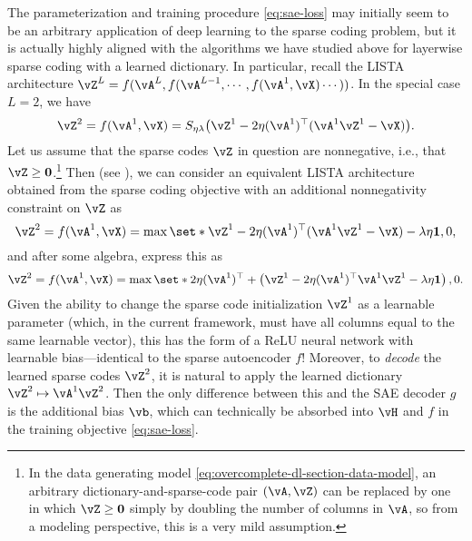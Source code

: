 \documentclass[../../book-main.tex]{subfiles}
\begin{document}
The parameterization and training procedure \eqref{eq:sae-loss} may initially
seem to be an arbitrary application of deep learning to the sparse coding
problem, but it is actually highly aligned with the algorithms we have studied
above for layerwise sparse coding with a learned dictionary.
In particular, recall the LISTA %
architecture $\vZ^{L} = f(\vA^L, f(\vA^{L-1}, \cdots, f(\vA^1, \vX) \cdots ))$.
In the special case $L=2$, we have
\begin{equation}
    \vZ^2 = f(\vA^1, \vX) 
    =S_{\eta\lambda}\rp{\vZ^{1} - 2\eta(\vA^{1})^{\top}(\vA^1\vZ^{1} - \vX)}.
\end{equation}
Let us assume that the sparse codes $\vZ$ in question are nonnegative, i.e.,
that $\vZ \geq \Zero$.\footnote{In the data generating model
\eqref{eq:overcomplete-dl-section-data-model}, an arbitrary
dictionary-and-sparse-code pair $(\vA, \vZ)$ can be replaced by one in which
$\vZ \geq \Zero$ simply by doubling the number of columns in $\vA$, so from
a modeling perspective, this is a very mild assumption.}
Then (see ), we can consider an equivalent
LISTA architecture obtained from the sparse coding objective with an additional
nonnegativity constraint on $\vZ$ as
\begin{equation}
    \vZ^2 = f(\vA^1, \vX) 
    =\max \set*{\vZ^{1} - 2\eta(\vA^{1})^{\top}(\vA^1\vZ^{1} - \vX)
    - \lambda\eta \mathbf{1}, 0},
\end{equation}
and after some algebra, express this as
\begin{equation}
    \vZ^2 = f(\vA^1, \vX) 
    =\max \set*{
        2\eta(\vA^{1})^{\top}
        +
        \left(
        \vZ^{1} - 2\eta(\vA^{1})^{\top}\vA^1\vZ^{1} - \lambda\eta \mathbf{1}
        \right), 0
    }.
\end{equation}
Given the ability to change the sparse code initialization $\vZ^1$ as
a learnable parameter (which, in the current framework, must have all columns
equal to the same learnable vector), this has the form of a ReLU neural network
with learnable bias---identical to the sparse autoencoder $f$!
Moreover, to \textit{decode} the learned sparse codes $\vZ^2$, it is natural to
apply the learned dictionary $\vZ^2 \mapsto \vA^1 \vZ^2$. Then the only
difference between this and the SAE decoder $g$ is the additional bias $\vb$,
which can technically be absorbed into $\vH$ and $f$ in the training objective
\eqref{eq:sae-loss}.
\end{document}
